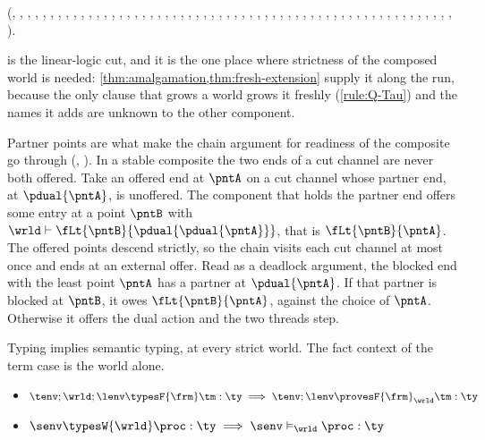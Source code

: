 (, , , ,
, , , ,
, , , ,
, , , ,
, , , ,
, , , ,
, , , ,
, , , ,
, , , ,
, , , ,
, , , ,
, , , ,
, , , ,
, , , ,
, , ).

 is the linear-logic cut, and it is the one place
where strictness of the composed world is needed:
\cref{thm:amalgamation,thm:fresh-extension} supply it along the run,
because the only clause that grows a world grows it freshly
(\ref{rule:Q-Tau}) and the names it adds are unknown to the other
component.

Partner points are what make the chain argument for readiness of the
composite go through (, ). In a stable
composite the two ends of a cut channel are never both offered. Take an
offered end at $\pntA$ on a cut channel whose partner end, at
$\pdual{\pntA}$, is unoffered. The component that holds the partner end
offers some entry at a point $\pntB$ with
$\wrld \types \fLt{\pntB}{\pdual{\pdual{\pntA}}}$, that is
$\fLt{\pntB}{\pntA}$. The offered points descend strictly, so the chain
visits each cut channel at most once and ends at an external offer. Read
as a deadlock argument, the blocked end with the least point $\pntA$ has
a partner at $\pdual{\pntA}$. If that partner is blocked at $\pntB$, it
owes $\fLt{\pntB}{\pntA}$, against the choice of $\pntA$. Otherwise it
offers the dual action and the two threads step.

\begin{theorem}
\label{th:fundamental}
  Typing implies semantic typing, at every strict world. The fact context
  of the term case is the world alone.
  \begin{itemize}
    \item
      $
        \tenv ; \wrld ; \lenv \typesF{\frm} \tm : \ty
        \implies
        \tenv ; \lenv \provesF{\frm}_{\wrld} \tm : \ty
      $
    \item
      $
        \senv \typesW{\wrld} \proc : \ty
        \implies
        \senv \proves_{\wrld} \proc : \ty
      $
  \end{itemize}
\end{theorem}

